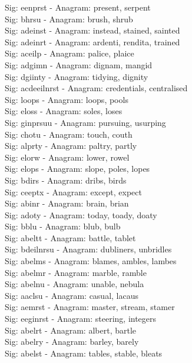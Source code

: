 Sig: {eenprst} - Anagram: present, serpent \\
Sig: {bhrsu} - Anagram: brush, shrub \\
Sig: {adeinst} - Anagram: instead, stained, sainted \\
Sig: {adeinrt} - Anagram: ardenti, rendita, trained \\
Sig: {aceilp} - Anagram: palice, plaice \\
Sig: {adgimn} - Anagram: dignam, mangid \\
Sig: {dgiinty} - Anagram: tidying, dignity \\
Sig: {acdeeilnrst} - Anagram: credentials, centralised \\
Sig: {loops} - Anagram: loops, pools \\
Sig: {eloss} - Anagram: soles, loses \\
Sig: {ginprsuu} - Anagram: pursuing, usurping \\
Sig: {chotu} - Anagram: touch, couth \\
Sig: {alprty} - Anagram: paltry, partly \\
Sig: {elorw} - Anagram: lower, rowel \\
Sig: {elops} - Anagram: slope, poles, lopes \\
Sig: {bdirs} - Anagram: dribs, birds \\
Sig: {ceeptx} - Anagram: except, expect \\
Sig: {abinr} - Anagram: brain, brian \\
Sig: {adoty} - Anagram: today, toady, doaty \\
Sig: {bblu} - Anagram: blub, bulb \\
Sig: {abeltt} - Anagram: battle, tablet \\
Sig: {bdeilnrsu} - Anagram: dubliners, unbridles \\
Sig: {abelms} - Anagram: blames, ambles, lambes \\
Sig: {abelmr} - Anagram: marble, ramble \\
Sig: {abelnu} - Anagram: unable, nebula \\
Sig: {aaclsu} - Anagram: casual, lacaus \\
Sig: {aemrst} - Anagram: master, stream, stamer \\
Sig: {eeginrst} - Anagram: steering, integers \\
Sig: {abelrt} - Anagram: albert, bartle \\
Sig: {abelry} - Anagram: barley, barely \\
Sig: {abelst} - Anagram: tables, stable, bleats \\
